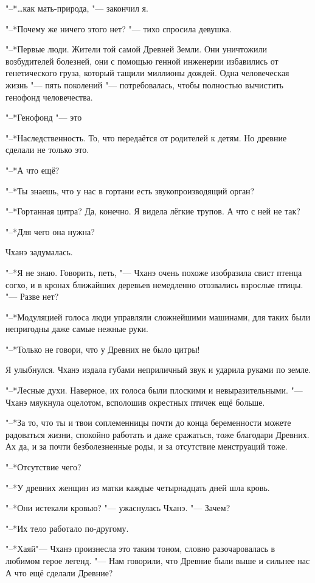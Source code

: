 \documentclass[a4paper,10pt]{book}
\newcommand{\ldotst}{\so{...}\xspace}
\begin{document}
"--*\ldots как мать-природа, "--- закончил я.

"--*Почему же ничего этого нет? "--- тихо спросила девушка.

"--*Первые люди. Жители той самой Древней Земли. Они уничтожили возбудителей 
болезней, они с помощью генной инженерии избавились от генетического груза, 
который тащили миллионы дождей. Одна человеческая жизнь "--- пять поколений 
"--- 
потребовалась, чтобы полностью вычистить генофонд человечества. 

"--*Генофонд "--- это\ldotst

"--*Наследственность. То, что передаётся от родителей к детям. Но древние 
сделали не только это.

"--*А что ещё?

"--*Ты знаешь, что у нас в гортани есть звукопроизводящий орган?

"--*Гортанная цитра? Да, конечно. Я видела лёгкие трупов. А что с ней не так?

"--*Для чего она нужна?

Чханэ задумалась.

"--*Я не знаю. Говорить, петь, "--- Чханэ очень похоже изобразила свист птенца 
согхо, и в кронах ближайших деревьев немедленно отозвались взрослые птицы. "--- 
Разве нет?

"--*Модуляцией голоса люди управляли сложнейшими машинами, для таких были 
непригодны даже самые нежные руки.

"--*Только не говори, что у Древних не было цитры!

Я улыбнулся. Чханэ издала губами неприличный звук и ударила руками по земле.

"--*Лесные духи. Наверное, их голоса были плоскими и невыразительными. "--- 
Чханэ мяукнула оцелотом, всполошив окрестных птичек ещё больше.

"--*За то, что ты и твои соплеменницы почти до конца беременности можете 
радоваться жизни, спокойно работать и даже сражаться, тоже благодари Древних. 
Ах да, и за почти безболезненные роды, и за отсутствие менструаций тоже.

"--*Отсутствие чего?

"--*У древних женщин из матки каждые четырнадцать дней шла кровь.

"--*Они истекали кровью? "--- ужаснулась Чханэ. "--- Зачем?

"--*Их тело работало по-другому.

"--*Хаяй\ldotst "--- Чханэ произнесла это таким тоном, словно разочаровалась в 
любимом герое легенд. "--- Нам говорили, что Древние были выше и сильнее 
нас\ldotst А что ещё сделали Древние?
\end{document}
